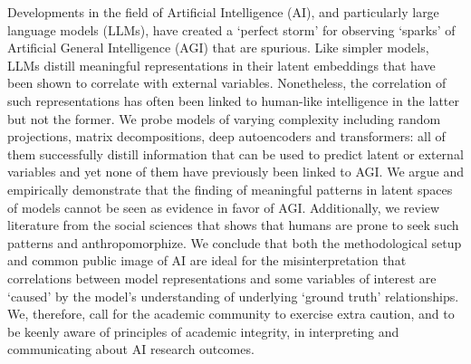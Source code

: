 Developments in the field of Artificial Intelligence (AI), and particularly large language models (LLMs), have created a `perfect storm’ for observing `sparks’ of Artificial General Intelligence (AGI) that are spurious. Like simpler models, LLMs distill meaningful representations in their latent embeddings that have been shown to correlate with external variables. Nonetheless, the correlation of such representations has often been linked to human-like intelligence in the latter but not the former. We probe models of varying complexity including random projections, matrix decompositions, deep autoencoders and transformers: all of them successfully distill information that can be used to predict latent or external variables and yet none of them have previously been linked to AGI. We argue and empirically demonstrate that the finding of meaningful patterns in latent spaces of models cannot be seen as evidence in favor of AGI. Additionally, we review literature from the social sciences that shows that humans are prone to seek such patterns and anthropomorphize. We conclude that both the methodological setup and common public image of AI are ideal for the misinterpretation that correlations between model representations and some variables of interest are `caused' by the model's understanding of underlying `ground truth’ relationships. We, therefore, call for the academic community to exercise extra caution, and to be keenly aware of principles of academic integrity, in interpreting and communicating about AI research outcomes.